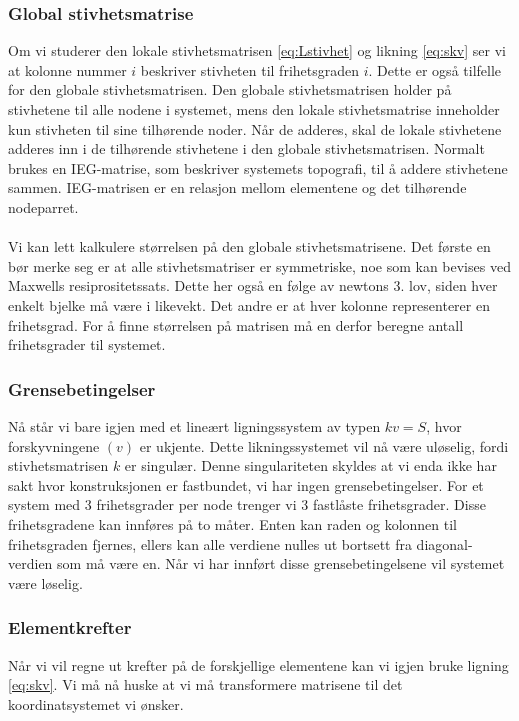 \documentclass[10pt,a4paper, norsk]{article}
\begin{document}
\subsubsection{Global stivhetsmatrise}
Om vi studerer den lokale stivhetsmatrisen \ref{eq:Lstivhet} og likning \ref{eq:skv} ser vi at kolonne nummer $i$ beskriver stivheten til frihetsgraden $i$. Dette er også tilfelle for den globale stivhetsmatrisen. Den globale stivhetsmatrisen holder på stivhetene til alle nodene i systemet, mens den lokale stivhetsmatrise inneholder kun stivheten til sine tilhørende noder. Når de adderes, skal de lokale stivhetene adderes inn i de tilhørende stivhetene i den globale stivhetsmatrisen. Normalt brukes en IEG-matrise, som beskriver systemets topografi, til å addere stivhetene sammen. IEG-matrisen er en relasjon mellom elementene og det tilhørende nodeparret.

\paragraph*{}
Vi kan lett kalkulere størrelsen på den globale stivhetsmatrisene. Det første en bør merke seg er at alle stivhetsmatriser er symmetriske, noe som kan bevises ved Maxwells resiprositetssats. Dette her også en følge av newtons 3. lov, siden hver enkelt bjelke må være i likevekt. Det andre er at hver kolonne representerer en frihetsgrad. For å finne størrelsen på matrisen må en derfor beregne antall frihetsgrader til systemet.

\subsubsection{Grensebetingelser}
Nå står vi bare igjen med et lineært ligningssystem av typen $kv=S$, hvor forskyvningene $(v)$ er ukjente. Dette likningssystemet vil nå være uløselig, fordi stivhetsmatrisen $k$ er singulær. Denne singulariteten skyldes at vi enda ikke har sakt hvor konstruksjonen er fastbundet, vi har ingen grensebetingelser. For et system med 3 frihetsgrader per node trenger vi 3 fastlåste frihetsgrader. Disse frihetsgradene kan innføres på to måter. Enten kan raden og kolonnen til frihetsgraden fjernes, ellers kan alle verdiene nulles ut bortsett fra diagonal-verdien som må være en. Når vi har innført disse grensebetingelsene vil systemet være løselig.

\subsubsection{Elementkrefter}
Når vi vil regne ut krefter på de forskjellige elementene kan vi igjen bruke ligning \ref{eq:skv}. Vi må nå huske at vi må transformere matrisene til det koordinatsystemet vi ønsker. 
\end{document}
